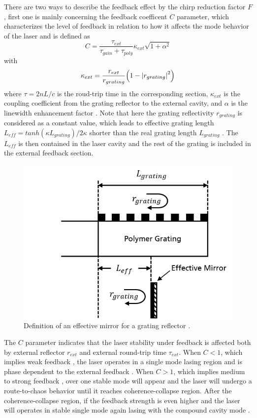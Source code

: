 There are two ways to describe the feedback effect by the chirp reduction factor $F$, first one is mainly concerning the feedback coefficent $C$ parameter, which characterizes the level of feedback in relation to how it affects the mode behavior of the laser and is defined as \cite{petermann2012laser}
\begin{equation}
    C=\frac{\tau_{ext}}{\tau_{gain}+\tau_{poly}}\kappa_{ext}\sqrt{1+\alpha^2}
    \label{eq:C}
\end{equation}
with
\begin{equation}
    \kappa_{ext}=\frac{r_{ext}}{r_{grating}}\qty(1-\abs{r_{grating}}^2)
    \label{eq:kappa_ext}
\end{equation}
where $\tau=2nL/c$ is the roud-trip time in the corresponding section, $\kappa_{ext}$ is the coupling coefficient from the grating reflector to the external cavity, and $\alpha$ is the linewidth enhancement factor \cite{henry1982theory}. Note that here the grating reflectivity $r_{grating}$ is considered as a constant value, which leads to effective grating length $L_{eff}=tanh(\kappa L_{grating})/2\kappa$ shorter than the real grating length $L_{grating}$ \cite{kuznetsov1988theory}. The $L_{eff}$ is then contained in the laser cavity and the rest of the grating is included in the external feedback section.

\begin{figure}[ht]
    \centering
    \includegraphics[width=.6\linewidth]{figures/L_grating_eff.png}
    \caption{Definition of an effective mirror for a grating reflector \cite{coldren2012diode}.}
    \label{fig:L_grating_eff}
\end{figure}

The $C$ parameter indicates that the laser stability under feedback is affected both by external reflector $r_{ext}$ and external round-trip time $\tau_{ext}$. When $C<1$, which implies weak feedback \cite{petermann2012laser,ohtsubo2012semiconductor}, the laser operates in a single mode lasing region and is phase dependent to the external feedback \cite{petermann2012laser, ohtsubo2012semiconductor}. When $C>1$, which implies medium to strong feedback \cite{petermann2012laser,ohtsubo2012semiconductor}, over one stable mode will appear and the laser will undergo a route-to-chaos behavior until it reaches coherence-collapse \cite{lenstra1985coherence} region. After the coherence-collapse region, if the feedback strength is even higher and the laser will operates in stable single mode again lasing with the compound cavity mode \cite{donati2013diagram}.

